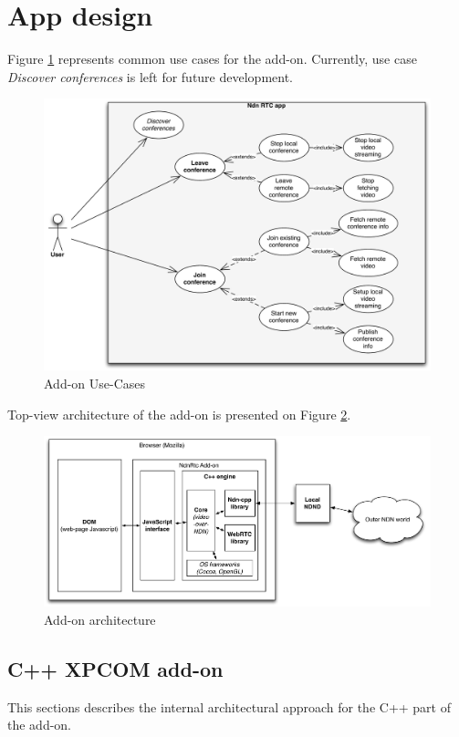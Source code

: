 \documentclass[12pt]{article}
\begin{document}
\section{App design}
Figure \ref{fig:uc} represents common use cases for the add-on. Currently, use case \textit{Discover conferences} is left for future development.
\begin{figure}
\centering
\includegraphics[width=\textwidth]{../res/graphics/addon-uc}
\caption{Add-on Use-Cases}
\label{fig:uc}
\end{figure}


Top-view architecture of the add-on is presented on Figure \ref{fig:arch}.
\begin{figure}
\centering
\includegraphics[width=\textwidth]{../res/graphics/addon-arch}
\caption{Add-on architecture}
\label{fig:arch}
\end{figure}

\subsection{C++ XPCOM add-on}
This sections describes the internal architectural approach for the C++ part of the add-on.
\end{document}
